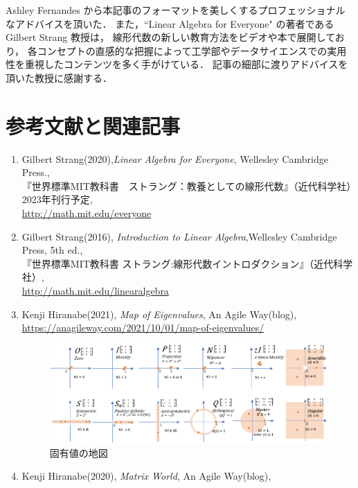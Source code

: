 \documentclass[letterpaper]{article}
\begin{document}
Ashley Fernandes から本記事のフォーマットを美しくするプロフェッショナルなアドバイスを頂いた．
また，``Linear Algebra for Everyone" の著者である Gilbert Strang 教授は，
線形代数の新しい教育方法をビデオや本で展開しており，
各コンセプトの直感的な把握によって工学部やデータサイエンスでの実用性を重視したコンテンツを多く手がけている．
記事の細部に渡りアドバイスを頂いた教授に感謝する．

\section*{参考文献と関連記事}
\begin{enumerate}
  \item 
  Gilbert Strang(2020),\emph{Linear Algebra for Everyone}, Wellesley Cambridge Press.,\\
  『世界標準MIT教科書　ストラング：教養としての線形代数』（近代科学社）2023年刊行予定, \\
  \href{http://math.mit.edu/everyone}{http://math.mit.edu/everyone}
  \item
  Gilbert Strang(2016), \emph{Introduction to Linear Algebra},Wellesley Cambridge Press, 5th ed.,\\
  『世界標準MIT教科書 ストラング:線形代数イントロダクション』（近代科学社）,\\
  \href{http://math.mit.edu/linearalgebra}{http://math.mit.edu/linearalgebra}
  \item Kenji Hiranabe(2021), \emph{Map of Eigenvalues}, An Agile Way(blog),\\
  \href{https://anagileway.com/2021/10/01/map-of-eigenvalues/}{https://anagileway.com/2021/10/01/map-of-eigenvalues/}\\
  \begin{figure}[H]
    \includegraphics[keepaspectratio, width=\linewidth]{MapofEigenvalues-j.eps}
    \caption{固有値の地図}
  \end{figure}
  \item Kenji Hiranabe(2020), \emph{Matrix World}, An Agile Way(blog),\\

\end{enumerate}
\end{document}
